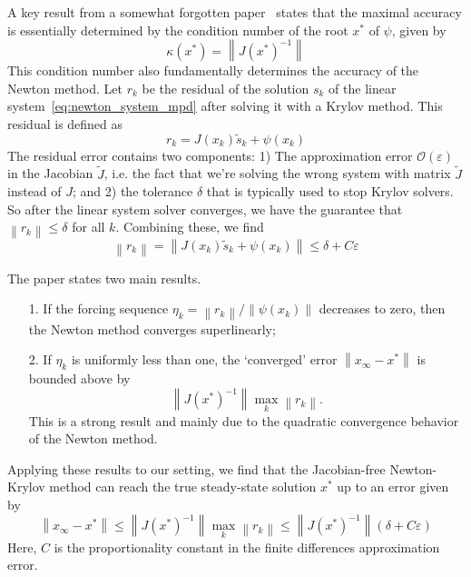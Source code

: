 \documentclass{article}
\newcommand{\norm}[1]{\left\lVert #1 \right\rVert}
\begin{document}
A key result from a somewhat forgotten paper~\cite{dembo1982inexact} states that the maximal accuracy is essentially determined by the condition number of the root $x^*$ of $\psi$, given by 
\begin{equation}
    \kappa(x^*)= \norm{J(x^*)^{-1}}
\end{equation}
This condition number also fundamentally determines the accuracy of the Newton method. Let $r_k$ be the residual of the solution $s_k$ of the linear system~\eqref{eq:newton_system_mpd} after solving it with a Krylov method. This residual is defined as
\begin{equation} \label{eq:residual}
    r_k = J(x_k) \tilde{s}_k + \psi(x_k)
\end{equation}
The residual error contains two components: 1) The approximation error $\mathcal{O}(\varepsilon)$ in the Jacobian $\tilde{J}$, i.e. the fact that we're solving the wrong system with matrix $\tilde{J}$ instead of $J$; and 2) the tolerance $\delta$ that is typically used to stop Krylov solvers. So after the linear system solver converges, we have the guarantee that $\norm{r_k} \leq \delta$ for all $k$. Combining these, we find
\begin{equation}
    \norm{r_k} = \norm{J(x_k) \tilde{s}_k + \psi(x_k)} \leq \delta + C \varepsilon
\end{equation}

The paper states two main results.
\begin{itemize}
\item[1.] If the forcing sequence $\eta_k = \norm{r_k} / \norm{\psi(x_k)}$ decreases to zero, then the Newton method converges superlinearly; 
\item[2.] If $\eta_k$ is uniformly less than one, the `converged' error $\norm{x_{\infty} - x^*}$ is bounded above by 
\begin{equation*}
    \norm{J(x^*)^{-1}} \max_k \norm{r_k}.
\end{equation*}
This is a strong result and mainly due to the quadratic convergence behavior of the  Newton method.
\end{itemize}

Applying these results to our setting, we find that the Jacobian-free Newton-Krylov method can reach the true steady-state solution $x^*$ up to an error given by
\begin{equation} \label{eq:nk_accuracy}
    \norm{x_{\infty} - x^*} \leq \norm{J(x^*)^{-1}} \max_k \norm{r_k} \leq \norm{J(x^*)^{-1}} \left(\delta + C \varepsilon\right)
\end{equation}
Here, $C$ is the proportionality constant in the finite differences approximation error.
\end{document}

